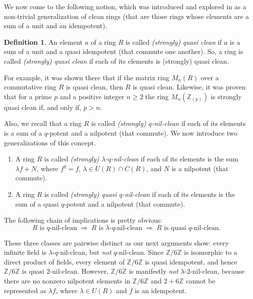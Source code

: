 \documentclass{amsart}
\theoremstyle{definition}
\newtheorem{definition}[theorem]{Definition}
\theoremstyle{remark}
\numberwithin{equation}{section}
\begin{document}
We now come to the following notion, which was introduced and explored in \cite{quasi-clean} as a non-trivial generalization of clean rings (that are those rings whose elements are a sum of a unit and an idempotent).

\begin{definition}
An element $a$ of a ring $R$ is called {\it (strongly) quasi clean} if $a$ is a sum of a unit and a quasi idempotent (that commute one another). So, a ring is called {\it (strongly) quasi clean} if each of its elements is (strongly) quasi clean.
\end{definition}

For example, it was shown there that if the matrix ring $M_{n}(R)$ over a commutative ring $R$ is quasi clean, then $R$ is quasi clean. Likewise, it was proven that for a prime $p$ and a positive integer $n \geq 2$ the ring $M_{n}(\mathbb{Z}_{(p)})$ is strongly quasi clean if, and only if, $p > n$.
\medskip

Also, we recall that a ring $R$ is called {\it (strongly) $q$-nil-clean} if each of its elements is a sum of a $q$-potent and a nilpotent (that commute). We now introduce two generalizations of this concept.

\begin{enumerate}
\item A ring $R$ is called {\it (strongly) $\lambda$-$q$-nil-clean} if each of its elements is the sum $\lambda f + N$, where $f^{q}=f$, ${\lambda \in U(R) \cap C(R)}$, and $N$ is a nilpotent (that commute).
\item A ring $R$ is called {\it (strongly) quasi $q$-nil-clean} if each of its elements is the sum of a quasi $q$-potent and a nilpotent (that commute).
\end{enumerate}

The following chain of implications is pretty obvious:
\[
  \text{$R$ is $q$-nil-clean} \;\Rightarrow\;
  \text{$R$ is $\lambda$-$q$-nil-clean} \;\Rightarrow\;
  \text{$R$ is quasi $q$-nil-clean}.
\]

These three classes are pairwise distinct as our next arguments show: every infinite field is $\lambda$-$q$-nil-clean, but {\it not} $q$-nil-clean. Since $\mathbb{Z}/6\mathbb{Z}$ is isomorphic to a direct product of fields, every element of $\mathbb{Z}/6\mathbb{Z}$ is quasi idempotent, and hence $\mathbb{Z}/6\mathbb{Z}$ is quasi $2$-nil-clean. However, $\mathbb{Z}/6\mathbb{Z}$ is manifestly {\it not} $\lambda$-$2$-nil-clean, because there are no nonzero nilpotent elements in $\mathbb{Z}/6\mathbb{Z}$ and $2 + 6\mathbb{Z}$ cannot be represented as $\lambda f$, where $\lambda \in U(R)$ and $f$ is an idempotent.
\end{document}
